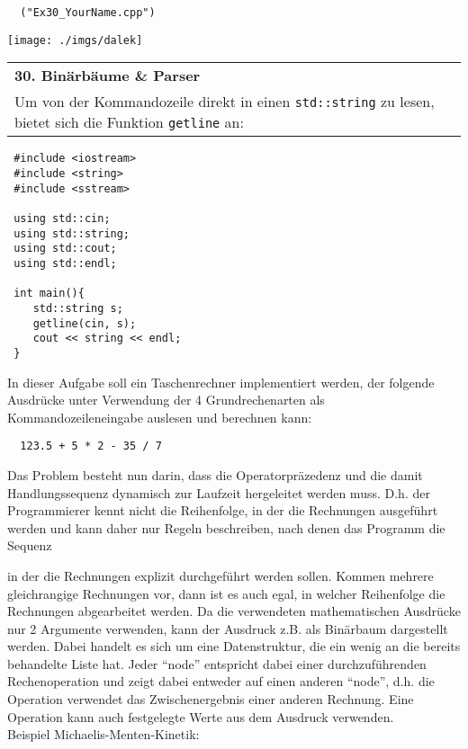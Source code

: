 \documentclass[paper=A4, pagesize, DIV=calc, smallheadings,
fontsize=11pt, expansion=false]{scrreprt}
\begin{document}
\begin{verbatim}
  ("Ex30_YourName.cpp")
\end{verbatim}



\begin{minipage}[H]{0.175\linewidth}
\texttt{[image: ./imgs/dalek]}
\end{minipage}
\begin{tabular}{m{35em}}
\textbf{30. Binärbäume \& Parser} \\  
Um von der Kommandozeile direkt in einen \texttt{std::string} zu lesen, bietet sich die Funktion \texttt{getline} an:
\end{tabular}
\begin{verbatim}
 #include <iostream>
 #include <string>
 #include <sstream>

 using std::cin;
 using std::string;
 using std::cout;
 using std::endl;

 int main(){
    std::string s;
    getline(cin, s);
    cout << string << endl;
 }
\end{verbatim}
In dieser Aufgabe soll ein Taschenrechner implementiert werden, der folgende Ausdrücke unter Verwendung der 4 Grundrechenarten als Kommandozeileneingabe auslesen und berechnen kann:
\begin{verbatim}
  123.5 + 5 * 2 - 35 / 7
\end{verbatim}
Das Problem besteht nun darin, dass die Operatorpräzedenz und die damit Handlungssequenz dynamisch zur Laufzeit hergeleitet werden muss.
D.h. der Programmierer kennt nicht die Reihenfolge, in der die Rechnungen ausgeführt werden und kann daher nur Regeln beschreiben, nach denen das Programm die Sequenz 

 in der die Rechnungen explizit durchgeführt werden sollen. Kommen mehrere gleichrangige Rechnungen vor, dann ist es auch egal, in welcher Reihenfolge die Rechnungen abgearbeitet werden.
Da die verwendeten mathematischen Ausdrücke nur 2 Argumente verwenden,
kann der Ausdruck z.B. als Binärbaum dargestellt werden. Dabei handelt es sich um eine Datenstruktur, die ein wenig an die bereits behandelte Liste hat.
Jeder ``node'' entspricht dabei einer durchzuführenden Rechenoperation und zeigt dabei entweder auf einen anderen ``node'', d.h. die Operation verwendet das Zwischenergebnis einer anderen Rechnung.
Eine Operation kann auch festgelegte Werte aus dem Ausdruck verwenden.
\\
Beispiel Michaelis-Menten-Kinetik:
\end{document}
